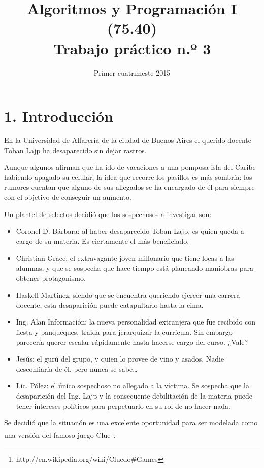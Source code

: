 \documentclass[12pt,spanish,]{article}
\title{Algoritmos y Programación I (75.40)\\Trabajo práctico n.º 3}
\date{Primer cuatrimeste 2015}
\begin{document}
\maketitle

\section{1. Introducción}\label{introducciuxf3n}

En la Universidad de Alfarería de la ciudad de Buenos Aires el querido
docente Toban Lajp ha desaparecido sin dejar rastros.

Aunque algunos afirman que ha ido de vacaciones a una pomposa isla del
Caribe habiendo apagado su celular, la idea que recorre los pasillos es
más sombría: los rumores cuentan que alguno de sus allegados se ha
encargado de él para siempre con el objetivo de conseguir un aumento.

Un plantel de selectos decidió que los sospechosos a investigar son:

\begin{itemize}
\itemsep1pt\parskip0pt
\item
  Coronel D. Bárbara: al haber desaparecido Toban Lajp, es quien queda a
  cargo de su materia. Es ciertamente el más beneficiado.
\item
  Christian Grace: el extravagante joven millonario que tiene locas a
  las alumnas, y que se sospecha que hace tiempo está planeando
  maniobras para obtener protagonismo.
\item
  Haskell Martinez: siendo que se encuentra queriendo ejercer una
  carrera docente, esta desaparición puede catapultarlo hasta la cima.
\item
  Ing. Alan Información: la nueva personalidad extranjera que fue
  recibido con fiesta y panqueques, traida para jerarquizar la
  currícula. Sin embargo parecería querer escalar rápidamente hasta
  hacerse cargo del curso. ¿Vale?
\item
  Jesús: el gurú del grupo, y quien lo provee de vino y asados. Nadie
  desconfiaría de él, pero nunca se sabe\ldots{}
\item
  Lic. Pólez: el único sospechoso no allegado a la víctima. Se sospecha
  que la desaparición del Ing. Lajp y la consecuente debilitación de la
  materia puede tener intereses políticos para perpetuarlo en su rol de
  no hacer nada.
\end{itemize}

Se decidió que la situación es una excelente oportunidad para ser
modelada como una versión del famoso juego Clue\footnote{http://en.wikipedia.org/wiki/Cluedo\#Games}.
\end{document}

